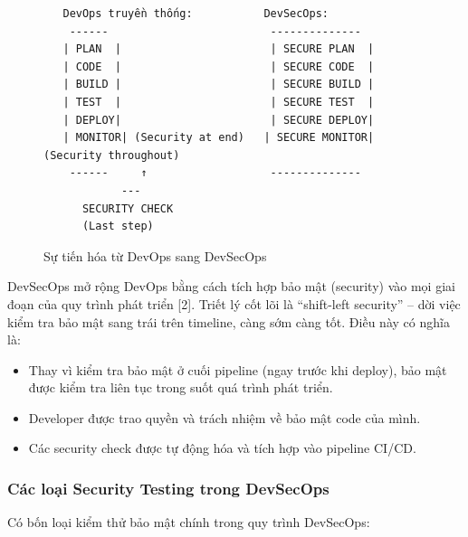 \documentclass[13pt,a4paper,twoside]{extarticle}
\begin{document}
\begin{figure}[H]
\centering
\begin{verbatim}
   DevOps truyền thống:           DevSecOps:
    ------                         -------------- 
   | PLAN  |                       | SECURE PLAN  |
   | CODE  |                       | SECURE CODE  |
   | BUILD |                       | SECURE BUILD |
   | TEST  |                       | SECURE TEST  |
   | DEPLOY|                       | SECURE DEPLOY|
   | MONITOR| (Security at end)   | SECURE MONITOR| (Security throughout)
    ------     ↑                   -------------- 
            --- 
      SECURITY CHECK
      (Last step)
\end{verbatim}
\caption{Sự tiến hóa từ DevOps sang DevSecOps}
\label{fig:devsecops}
\end{figure}

DevSecOps mở rộng DevOps bằng cách tích hợp bảo mật (security) vào mọi giai đoạn của quy trình phát triển [2]. Triết lý cốt lõi là ``shift-left security'' -- dời việc kiểm tra bảo mật sang trái trên timeline, càng sớm càng tốt. Điều này có nghĩa là:

\begin{itemize}[leftmargin=*,nosep]
  \item Thay vì kiểm tra bảo mật ở cuối pipeline (ngay trước khi deploy), bảo mật được kiểm tra liên tục trong suốt quá trình phát triển.
  \item Developer được trao quyền và trách nhiệm về bảo mật code của mình.
  \item Các security check được tự động hóa và tích hợp vào pipeline CI/CD.
\end{itemize}

\subsubsection{Các loại Security Testing trong DevSecOps}

Có bốn loại kiểm thử bảo mật chính trong quy trình DevSecOps:
\end{document}
